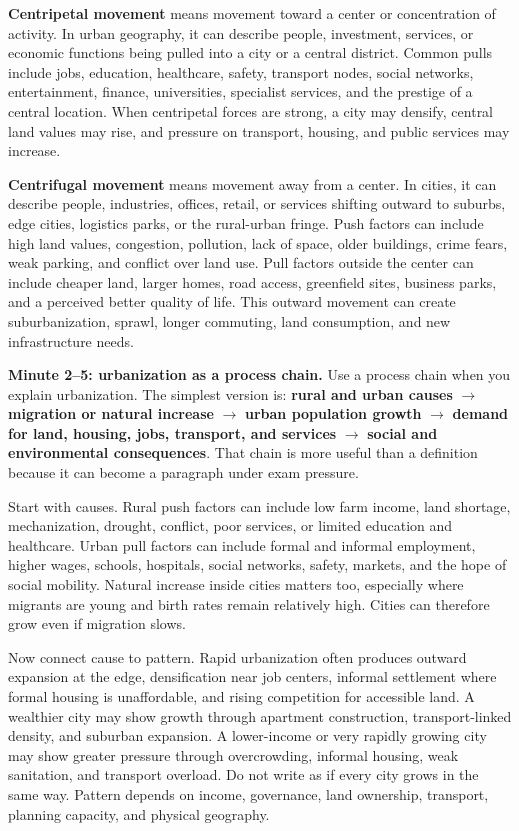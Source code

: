 \documentclass[11pt,a4paper]{article}
\newcommand{\term}[1]{\textcolor{HeadingBlue}{\textbf{#1}}}
\begin{document}
\term{Centripetal movement} means movement toward a center or concentration of
activity. In urban geography, it can describe people, investment, services, or
economic functions being pulled into a city or a central district. Common pulls
include jobs, education, healthcare, safety, transport nodes, social networks,
entertainment, finance, universities, specialist services, and the prestige of a
central location. When centripetal forces are strong, a city may densify,
central land values may rise, and pressure on transport, housing, and public
services may increase.

\term{Centrifugal movement} means movement away from a center. In cities, it can
describe people, industries, offices, retail, or services shifting outward to
suburbs, edge cities, logistics parks, or the rural-urban fringe. Push factors
can include high land values, congestion, pollution, lack of space, older
buildings, crime fears, weak parking, and conflict over land use. Pull factors
outside the center can include cheaper land, larger homes, road access,
greenfield sites, business parks, and a perceived better quality of life. This
outward movement can create suburbanization, sprawl, longer commuting, land
consumption, and new infrastructure needs.

\textbf{Minute 2--5: urbanization as a process chain.}
Use a process chain when you explain urbanization. The simplest version is:
\term{rural and urban causes} $\rightarrow$ \term{migration or natural increase}
$\rightarrow$ \term{urban population growth} $\rightarrow$ \term{demand for land,
housing, jobs, transport, and services} $\rightarrow$ \term{social and
environmental consequences}. That chain is more useful than a definition because
it can become a paragraph under exam pressure.

Start with causes. Rural push factors can include low farm income, land
shortage, mechanization, drought, conflict, poor services, or limited education
and healthcare. Urban pull factors can include formal and informal employment,
higher wages, schools, hospitals, social networks, safety, markets, and the
hope of social mobility. Natural increase inside cities matters too,
especially where migrants are young and birth rates remain relatively high.
Cities can therefore grow even if migration slows.

Now connect cause to pattern. Rapid urbanization often produces outward
expansion at the edge, densification near job centers, informal settlement where
formal housing is unaffordable, and rising competition for accessible land. A
wealthier city may show growth through apartment construction, transport-linked
density, and suburban expansion. A lower-income or very rapidly growing city may
show greater pressure through overcrowding, informal housing, weak sanitation,
and transport overload. Do not write as if every city grows in the same way.
Pattern depends on income, governance, land ownership, transport, planning
capacity, and physical geography.
\end{document}
